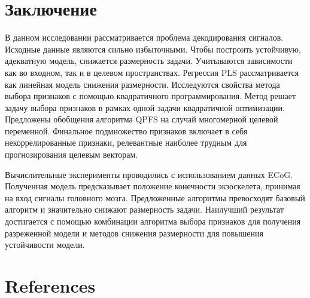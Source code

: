 \documentclass[preprint,12pt]{elsarticle}
\theoremstyle{definition}
\begin{document}
\section{Заключение}
В данном исследовании рассматривается проблема декодирования сигналов. 
Исходные данные являются сильно избыточными.
Чтобы построить устойчивую, адекватную модель, снижается размерность задачи.
Учитываются зависимости как во входном, так и в целевом пространствах.
Регрессия PLS рассматривается как линейная модель снижения размерности.
Исследуются свойства метода выбора признаков с помощью квадратичного программирования.
Метод решает задачу выбора признаков в рамках одной задачи квадратичной оптимизации.
Предложены обобщения алгоритма QPFS на случай многомерной целевой переменной.
Финальное подмножество признаков включает в себя некоррелированные признаки, релевантные наиболее трудным для прогнозирования целевым векторам.

Вычислительные эксперименты проводились с использованием данных ECoG. 
Полученная модель предсказывает положение конечности экзоскелета, принимая на вход сигналы головного мозга.
Предложенные алгоритмы превосходят базовый алгоритм и значительно снижают размерность задачи.
Наилучший результат достигается с помощью комбинации алгоритма выбора признаков для получения разреженной модели и методов снижения размерности для повышения устойчивости модели.

\section*{References}


\end{document}
